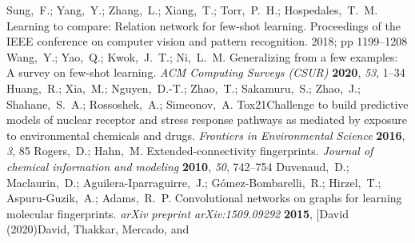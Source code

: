 \documentclass[journal=jcisd8,manuscript=article]{achemso} %
\begin{document}
\begin{mcitethebibliography}{34}
\mciteBstWouldAddEndPunctfalse
\mciteSetBstMidEndSepPunct{\mcitedefaultmidpunct}
{}{\mcitedefaultseppunct}\relax
\EndOfBibitem
{}
Sung,~F.; Yang,~Y.; Zhang,~L.; Xiang,~T.; Torr,~P.~H.; Hospedales,~T.~M.
  Learning to compare: Relation network for few-shot learning. Proceedings of
  the IEEE conference on computer vision and pattern recognition. 2018; pp
  1199--1208\relax
\mciteBstWouldAddEndPuncttrue
\mciteSetBstMidEndSepPunct{\mcitedefaultmidpunct}
{\mcitedefaultendpunct}{\mcitedefaultseppunct}\relax
\EndOfBibitem
{}
Wang,~Y.; Yao,~Q.; Kwok,~J.~T.; Ni,~L.~M. Generalizing from a few examples: A
  survey on few-shot learning. \emph{ACM Computing Surveys (CSUR)}
  \textbf{2020}, \emph{53}, 1--34\relax
\mciteBstWouldAddEndPuncttrue
\mciteSetBstMidEndSepPunct{\mcitedefaultmidpunct}
{\mcitedefaultendpunct}{\mcitedefaultseppunct}\relax
\EndOfBibitem
{}
Huang,~R.; Xia,~M.; Nguyen,~D.-T.; Zhao,~T.; Sakamuru,~S.; Zhao,~J.;
  Shahane,~S.~A.; Rossoshek,~A.; Simeonov,~A. Tox21Challenge to build
  predictive models of nuclear receptor and stress response pathways as
  mediated by exposure to environmental chemicals and drugs. \emph{Frontiers in
  Environmental Science} \textbf{2016}, \emph{3}, 85\relax
\mciteBstWouldAddEndPuncttrue
\mciteSetBstMidEndSepPunct{\mcitedefaultmidpunct}
{\mcitedefaultendpunct}{\mcitedefaultseppunct}\relax
\EndOfBibitem
{}
Rogers,~D.; Hahn,~M. Extended-connectivity fingerprints. \emph{Journal of
  chemical information and modeling} \textbf{2010}, \emph{50}, 742--754\relax
\mciteBstWouldAddEndPuncttrue
\mciteSetBstMidEndSepPunct{\mcitedefaultmidpunct}
{\mcitedefaultendpunct}{\mcitedefaultseppunct}\relax
\EndOfBibitem
{}
Duvenaud,~D.; Maclaurin,~D.; Aguilera-Iparraguirre,~J.;
  G{\'o}mez-Bombarelli,~R.; Hirzel,~T.; Aspuru-Guzik,~A.; Adams,~R.~P.
  Convolutional networks on graphs for learning molecular fingerprints.
  \emph{arXiv preprint arXiv:1509.09292} \textbf{2015}, \relax
\mciteBstWouldAddEndPunctfalse
\mciteSetBstMidEndSepPunct{\mcitedefaultmidpunct}
{}{\mcitedefaultseppunct}\relax
\EndOfBibitem
\bibitem[David (2020)David, Thakkar, Mercado, and

\end{mcitethebibliography}
\end{document}
